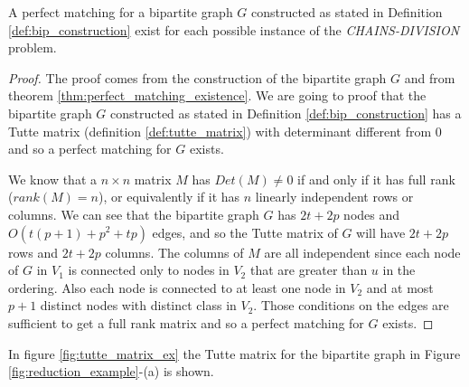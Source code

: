 \begin{lemma} \label{lemma:matching_existence}
    A perfect matching for a bipartite graph $G$ constructed as stated in Definition \ref{def:bip_construction} exist for each possible instance of the \textit{CHAINS-DIVISION} problem.
\end{lemma}

\begin{proof}
    The proof comes from the construction of the bipartite graph $G$ and from theorem \ref{thm:perfect_matching_existence}. We are going to proof that the bipartite graph $G$ constructed as stated in Definition \ref{def:bip_construction} has a Tutte matrix (definition \ref{def:tutte_matrix}) with determinant different from $0$ and so a perfect matching for $G$ exists.

    We know that a $n \times n$ matrix $M$ has $Det(M) \neq 0$ if and only if it has full rank ($rank(M) = n$), or equivalently if it has $n$ linearly independent rows or columns. We can see that the bipartite graph $G$ has $2t + 2p$ nodes and $O(t (p + 1) + p^2 + tp)$ edges, and so the Tutte matrix of $G$ will have $2t + 2p$ rows and $2t + 2p$ columns. The columns of $M$ are all independent since each node of $G$ in $V_1$ is connected only to nodes in $V_2$ that are greater than $u$ in the ordering. Also each node is connected to at least one node in $V_2$ and at most $p + 1$ distinct nodes with distinct class in $V_2$. Those conditions on the edges are sufficient to get a full rank matrix and so a perfect matching for $G$ exists.
\end{proof}

In figure \ref{fig:tutte_matrix_ex} the Tutte matrix for the bipartite graph in Figure \ref{fig:reduction_example}-(a) is shown.

